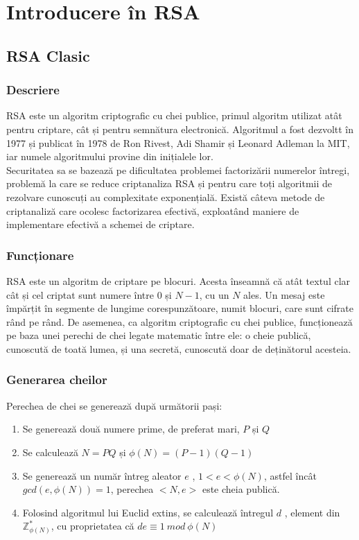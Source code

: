 \documentclass[12]{report}
\begin{document}
\tableofcontents
\chapter{Introducere în RSA}

\section{RSA Clasic}
\subsection{Descriere}

RSA este un algoritm criptografic cu chei publice, primul algoritm utilizat atât pentru criptare, cât și pentru semnătura electronică. Algoritmul a fost dezvoltt în 1977 și publicat în 1978 de Ron Rivest, Adi Shamir și Leonard Adleman la MIT, iar numele algoritmului provine din inițialele lor. \\
Securitatea sa se bazează pe dificultatea problemei factorizării numerelor întregi, problemă la care se reduce criptanaliza RSA și pentru care toți algoritmii de rezolvare cunoscuți au complexitate exponențială. Există câteva metode de criptanaliză care ocolesc factorizarea efectivă, exploatând maniere de implementare efectivă a schemei de criptare.
\subsection{Funcționare}
RSA este un algoritm de criptare pe blocuri. Acesta înseamnă că atât textul clar cât și cel criptat sunt numere între 0 și $N-1$, cu un $N$ ales. Un mesaj este împărțit în segmente de lungime corespunzătoare, numit blocuri, care sunt cifrate rând pe rând. De asemenea, ca algoritm criptografic cu chei publice, funcționează pe baza unei perechi de chei legate matematic între ele: o cheie publică, cunoscută de toată lumea, și una secretă, cunoscută doar de deținătorul acesteia.
\subsection{Generarea cheilor}
Perechea de chei se generează după următorii pași:
\begin{enumerate}
\item Se generează două numere prime, de preferat mari, $P$ și $Q$
\item Se calculează $N=PQ$ și $\phi(N)=(P-1)(Q-1)$
\item Se generează un număr întreg aleator $e$ , $1<e<\phi(N)$, astfel încât $gcd(e,\phi(N))=1$, perechea $<N,e>$ este cheia publică.
\item Folosind algoritmul lui Euclid extins, se calculează întregul $d$ , element din $\mathbb{Z}_{\phi(N)}^{*}$, cu proprietatea că $de \equiv 1 \ mod \ \phi(N)$
\end{enumerate}
\end{document}
